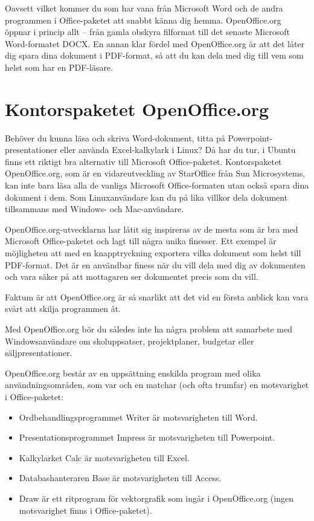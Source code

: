 \documentclass[a4paper,final]{memoir} %
\begin{document}
Oavsett vilket kommer du som har vana från Microsoft Word och de andra programmen i Office-paketet att snabbt känna dig hemma. OpenOffice.org öppnar i princip allt -- från gamla obskyra filformat till det senaste Microsoft Word-formatet DOCX. En annan klar fördel med OpenOffice.org är att det låter dig spara dina dokument i PDF-format, så att du kan dela med dig till vem som helst som har en PDF-läsare.

\section{Kontorspaketet OpenOffice.org}


Behöver du kunna läsa och skriva Word-dokument, titta på Powerpoint-presentationer eller använda Excel-kalkylark i Linux? Då har du tur, i Ubuntu finns ett riktigt bra alternativ till Microsoft Office-paketet. Kontorspaketet OpenOffice.org, som är en vidareutveckling av StarOffice från Sun Microsystems, kan inte bara läsa alla de vanliga Microsoft Office-formaten utan också spara dina dokument i dem. Som Linuxanvändare kan du på lika villkor dela dokument tillsammans med Windows- och Mac-användare. 

OpenOffice.org-utvecklarna har låtit sig inspireras av de mesta som är bra med Microsoft Office-paketet och lagt till några unika finesser. Ett exempel är möjligheten att med en knapptryckning exportera vilka dokument som helst till PDF-format. Det är en användbar finess när du vill dela med dig av dokumenten och vara säker på att mottagaren ser dokumentet precis som du vill.

Faktum är att OpenOffice.org är så snarlikt att det vid en första anblick kan vara svårt att skilja programmen åt. 

Med OpenOffice.org bör du således inte ha några problem att samarbete med Windowsanvändare om skoluppsatser, projektplaner, budgetar eller säljpresentationer.

OpenOffice.org består av en uppsättning enskilda program med olika användningsområden, som var och en matchar (och ofta trumfar) en motsvarighet i Office-paketet:

\begin{itemize}

\item Ordbehandlingsprogrammet Writer är motsvarigheten till Word.
\item Presentationsprogrammet Impress är motsvarigheten till Powerpoint.
\item Kalkylarket Calc är motsvarigheten till Excel.
\item Databashanteraren Base är motsvarigheten till Access.
\item Draw är ett ritprogram för vektorgrafik som ingår i OpenOffice.org (ingen motsvarighet finns i Office-paketet).

\end{itemize}
\end{document}
